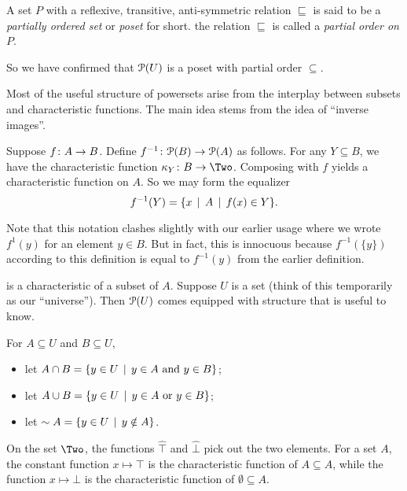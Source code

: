 \begin{defn}
	A set $P$ with a reflexive, transitive, anti-symmetric relation $\sqsubseteq$ is said to be a \emph{partially ordered set} or \emph{poset} for short. the relation $\sqsubseteq$ is called a \emph{partial order on $P$}. 
\end{defn}

So we have confirmed that ${\mathcal{P}}(U)$ is a poset with partial order $\subseteq$.

Most of the useful structure of powersets arise from the interplay between
subsets and characteristic functions. The main idea stems from the idea of ``inverse images''.

\begin{defn}
	Suppose ${f}\colon{A}\to{B}$. Define ${f^{-1}}\colon{{\mathcal{P}}(B)}\to{{\mathcal{P}}(A)}$ as follows. For any $Y\subseteq B$, we have the characteristic function $\fromto {\kappa_Y}B\Two$. 
	Composing with $f$ yields a characteristic function on $A$. So we may form the
	equalizer 
	\[ f^{-1}(Y) = \{x\,\mid\, A\,\mid\, f(x)\in Y\}.\] 
\end{defn}
Note that this notation clashes slightly with our earlier usage where we wrote $f^{1}(y)$ for an element $y\in B$. But in fact, this is innocuous because 
$f^{-1}(\{y\})$ according to this definition is equal to $f^{-1}(y)$ from the earlier definition.

is a characteristic of a subset of $A$. 
Suppose $U$ is a set (think of this temporarily as our ``universe''). 
Then ${\mathcal{P}}(U)$ comes equipped with structure that is useful to know.

\begin{defn}
	For $A\subseteq U$ and $B\subseteq U$, 
	\begin{itemize}
		\item let $A\cap B = \{y\in U\,\mid\, \text{$y\in A$  and $y\in B$}\}$;
		\item let $A\cup B = \{y\in U \,\mid\, \text{$y\in A$ or $y\in B$}\}$;
		\item let $\sim A = \{y\in U\,\mid\, y\notin A\}$.
	\end{itemize}
\end{defn}



On the set $\Two$, the functions $\hat{\top}$ and $\hat{\bot}$
pick out the two elements. For a set $A$, the constant function $x\mapsto \top$
is the characteristic function of $A\subseteq A$, while the function $x\mapsto \bot$ is the characteristic function of $\emptyset\subseteq A$. 


